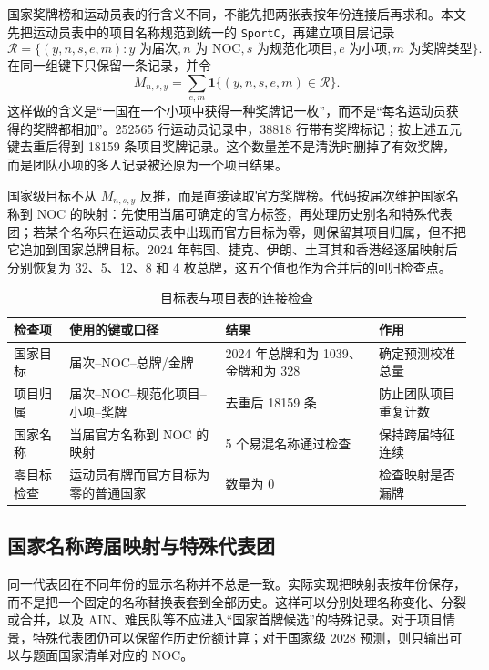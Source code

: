 \documentclass[UTF8,11pt,a4paper]{ctexart}
\begin{document}
国家奖牌榜和运动员表的行含义不同，不能先把两张表按年份连接后再求和。本文先把运动员表中的项目名称规范到统一的 \texttt{SportC}，再建立项目层记录
\begin{equation}
\mathcal{R}=\{(y,n,s,e,m):y\text{ 为届次},n\text{ 为 NOC},s\text{ 为规范化项目},e\text{ 为小项},m\text{ 为奖牌类型}\}.
\end{equation}
在同一组键下只保留一条记录，并令
\begin{equation}
M_{n,s,y}=\sum_{e,m}\mathbf{1}\{(y,n,s,e,m)\in\mathcal{R}\}.
\end{equation}
这样做的含义是“一国在一个小项中获得一种奖牌记一枚”，而不是“每名运动员获得的奖牌都相加”。252565 行运动员记录中，38818 行带有奖牌标记；按上述五元键去重后得到 18159 条项目奖牌记录。这个数量差不是清洗时删掉了有效奖牌，而是团队小项的多人记录被还原为一个项目结果。

国家级目标不从 $M_{n,s,y}$ 反推，而是直接读取官方奖牌榜。代码按届次维护国家名称到 NOC 的映射：先使用当届可确定的官方标签，再处理历史别名和特殊代表团；若某个名称只在运动员表中出现而官方目标为零，则保留其项目归属，但不把它追加到国家总牌目标。2024 年韩国、捷克、伊朗、土耳其和香港经逐届映射后分别恢复为 32、5、12、8 和 4 枚总牌，这五个值也作为合并后的回归检查点。

\begin{table}[H]
\centering
\caption{目标表与项目表的连接检查}
\label{tab:join-check}
\small
\begin{tabularx}{\textwidth}{p{2.2cm}p{3.4cm}p{3.0cm}X}
\toprule
检查项 & 使用的键或口径 & 结果 & 作用\\
\midrule
国家目标 & 届次--NOC--总牌/金牌 & 2024 年总牌和为 1039、金牌和为 328 & 确定预测校准总量\\
项目归属 & 届次--NOC--规范化项目--小项--奖牌 & 去重后 18159 条 & 防止团队项目重复计数\\
国家名称 & 当届官方名称到 NOC 的映射 & 5 个易混名称通过检查 & 保持跨届特征连续\\
零目标检查 & 运动员有牌而官方目标为零的普通国家 & 数量为 0 & 检查映射是否漏牌\\
\bottomrule
\end{tabularx}
\end{table}

\subsection{国家名称跨届映射与特殊代表团}

同一代表团在不同年份的显示名称并不总是一致。实际实现把映射表按年份保存，而不是把一个固定的名称替换表套到全部历史。这样可以分别处理名称变化、分裂或合并，以及 AIN、难民队等不应进入“国家首牌候选”的特殊记录。对于项目情景，特殊代表团仍可以保留作历史份额计算；对于国家级 2028 预测，则只输出可以与题面国家清单对应的 NOC。
\end{document}
